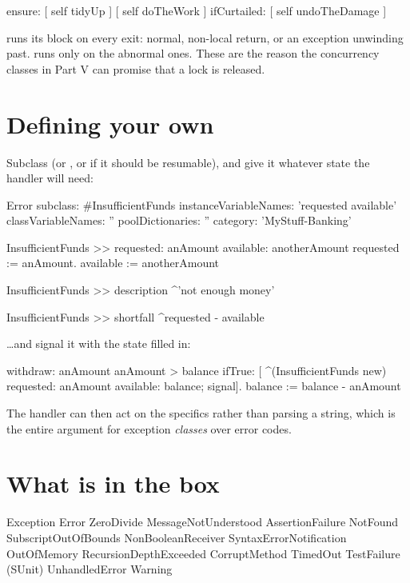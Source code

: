\begin{st}
 ensure: [ self tidyUp ]
[ self doTheWork ] ifCurtailed: [ self undoTheDamage ]
\end{st}

 runs its block on every exit: normal, non-local return, or an
exception unwinding past.  runs only on the abnormal ones.
These are the reason the concurrency classes in Part V can promise that a lock
is released.

\section{Defining your own}

Subclass  (or , or  if it should be
resumable), and give it whatever state the handler will need:

\begin{st}
Error subclass: #InsufficientFunds
    instanceVariableNames: 'requested available'
    classVariableNames: ''
    poolDictionaries: ''
    category: 'MyStuff-Banking'

InsufficientFunds >> requested: anAmount available: anotherAmount
    requested := anAmount.
    available := anotherAmount

InsufficientFunds >> description
    ^'not enough money'

InsufficientFunds >> shortfall
    ^requested - available
\end{st}

\ldots and signal it with the state filled in:

\begin{st}
withdraw: anAmount
    anAmount > balance ifTrue: [
        ^(InsufficientFunds new)
            requested: anAmount available: balance;
            signal].
    balance := balance - anAmount
\end{st}

The handler can then act on the specifics rather than parsing a string, which
is the entire argument for exception \emph{classes} over error codes.

\section{What is in the box}

\begin{plain}
Exception
    Error
        ZeroDivide
        MessageNotUnderstood
        AssertionFailure
        NotFound
        SubscriptOutOfBounds
        NonBooleanReceiver
        SyntaxErrorNotification
        OutOfMemory
        RecursionDepthExceeded
        CorruptMethod
        TimedOut
        TestFailure          (SUnit)
    UnhandledError
    Warning
\end{plain}

